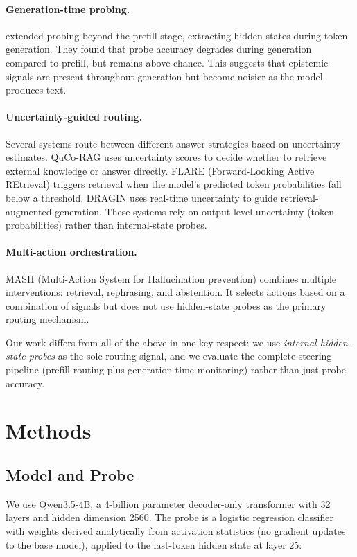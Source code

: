 \documentclass{article}
\begin{document}
\paragraph{Generation-time probing.}
\citet{liu2024reprobe} extended probing beyond the prefill stage, extracting hidden states during token generation. They found that probe accuracy degrades during generation compared to prefill, but remains above chance. This suggests that epistemic signals are present throughout generation but become noisier as the model produces text.

\paragraph{Uncertainty-guided routing.}
Several systems route between different answer strategies based on uncertainty estimates. QuCo-RAG uses uncertainty scores to decide whether to retrieve external knowledge or answer directly. FLARE (Forward-Looking Active REtrieval) triggers retrieval when the model's predicted token probabilities fall below a threshold. DRAGIN uses real-time uncertainty to guide retrieval-augmented generation. These systems rely on output-level uncertainty (token probabilities) rather than internal-state probes.

\paragraph{Multi-action orchestration.}
MASH (Multi-Action System for Hallucination prevention) combines multiple interventions: retrieval, rephrasing, and abstention. It selects actions based on a combination of signals but does not use hidden-state probes as the primary routing mechanism.

Our work differs from all of the above in one key respect: we use \emph{internal hidden-state probes} as the sole routing signal, and we evaluate the complete steering pipeline (prefill routing plus generation-time monitoring) rather than just probe accuracy.

\section{Methods}

\subsection{Model and Probe}

We use Qwen3.5-4B, a 4-billion parameter decoder-only transformer with 32 layers and hidden dimension 2560. The probe is a logistic regression classifier with weights derived analytically from activation statistics (no gradient updates to the base model), applied to the last-token hidden state at layer 25:
\end{document}
